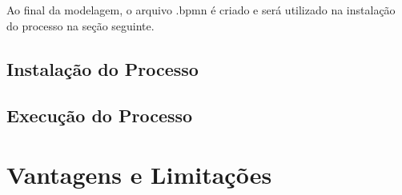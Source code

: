 Ao final da modelagem, o arquivo .bpmn é criado e será utilizado na instalação do processo na seção seguinte.

\subsection{Instalação do Processo}\label{sec:activiti-automatizar_processo_modelagem}

\subsection{Execução do Processo}\label{sec:activiti-automatizar_processo_modelagem}

\section{Vantagens e Limitações}\label{sec:activiti-vantages_limitacoes}


